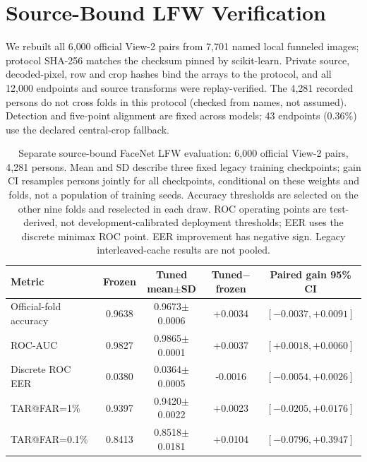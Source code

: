 \documentclass[journal]{IEEEtran}
\begin{document}
\section{Source-Bound LFW Verification}\label{sec:lfw-bound}
We rebuilt all 6{,}000 official View-2 pairs from 7{,}701 named local funneled images;
protocol SHA-256 matches the checksum pinned by scikit-learn. Private source, decoded-pixel,
row and crop hashes bind the arrays to the protocol, and all 12{,}000 endpoints and source
transforms were replay-verified. The 4{,}281 recorded persons do not cross folds in this
protocol (checked from names, not assumed). Detection and five-point alignment are fixed
across models; 43 endpoints (0.36\%) use the declared central-crop fallback.

\begin{table}[!t]
\caption{Separate source-bound FaceNet LFW evaluation: 6{,}000 official View-2 pairs, 4{,}281 persons. Mean and SD describe three fixed legacy training checkpoints; gain CI resamples persons jointly for all checkpoints, conditional on these weights and folds, not a population of training seeds. Accuracy thresholds are selected on the other nine folds and reselected in each draw. ROC operating points are test-derived, not development-calibrated deployment thresholds; EER uses the discrete minimax ROC point. EER improvement has negative sign. Legacy interleaved-cache results are not pooled.}
\label{tab:lfw-bound}
\centering\footnotesize
\begin{tabular}{@{}lcccc@{}}
\toprule
Metric & Frozen & Tuned mean$\pm$SD & Tuned$-$frozen & Paired gain 95\% CI \\
\midrule
Official-fold accuracy & 0.9638 & 0.9673$\pm$0.0006 & +0.0034 & $[-0.0037,+0.0091]$ \\
ROC-AUC & 0.9827 & 0.9865$\pm$0.0001 & +0.0037 & $[+0.0018,+0.0060]$ \\
Discrete ROC EER & 0.0380 & 0.0364$\pm$0.0005 & -0.0016 & $[-0.0054,+0.0026]$ \\
TAR@FAR=1\% & 0.9397 & 0.9420$\pm$0.0022 & +0.0023 & $[-0.0205,+0.0176]$ \\
TAR@FAR=0.1\% & 0.8413 & 0.8518$\pm$0.0181 & +0.0104 & $[-0.0796,+0.3947]$ \\
\bottomrule
\end{tabular}
\end{table}
\end{document}
